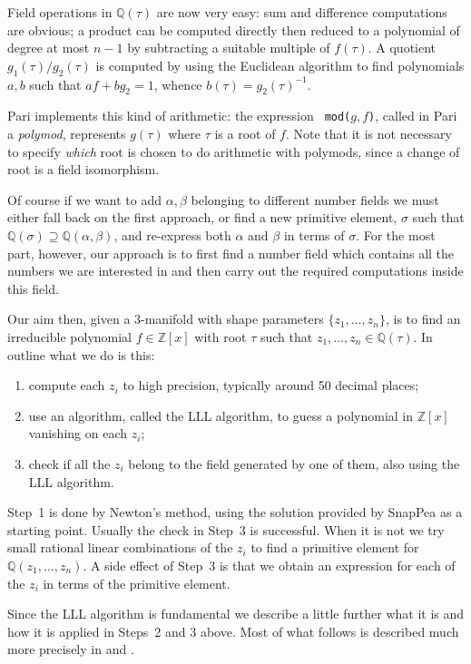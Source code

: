 \documentclass[a4paper]{amsart}
\def\Z{{\mathbb Z}}
\def\Q{{\mathbb Q}}
\theoremstyle{definition}
\begin{document}
Field operations in $\Q(\tau)$ are now very easy: sum and difference
computations are obvious; a product can be computed directly then
reduced to a polynomial of degree at most $n-1$ by subtracting a
suitable multiple of $f(\tau)$. A quotient  $g_1(\tau)/g_2(\tau)$ is
computed by using the Euclidean algorithm to find polynomials $a,b$ 
such that $af +
bg_2 = 1$, whence $b(\tau) = g_2(\tau)^{-1}$.

Pari \cite{pari} implements this kind of arithmetic: the expression {\tt
mod($g,f$)}, called in Pari a {\em polymod}, represents $g(\tau)$
where $\tau$ is a root of $f$. Note that it is not necessary to
specify {\em which} root is chosen to do arithmetic with polymods, since
a change of root is a field isomorphism.


Of course if we want to add $\alpha, \beta$ belonging to different
number fields we must either fall back on the first approach, or find
a new primitive element, $\sigma$ such that $\Q(\sigma) \supseteq
\Q(\alpha,\beta)$, and re-express both $\alpha$ and $\beta$ in terms of
$\sigma$. For the most part, however, our approach is to first find a
number field which contains all the numbers we are
interested in and then carry out the required computations inside this
field.


Our aim then, given a 3-manifold with shape parameters
$\{z_1,\ldots,z_n\}$, is to find an irreducible polynomial $f \in
\Z[x]$ with root $\tau$ such that $z_1,\ldots,z_n \in \Q(\tau)$. In
outline what we do is this:
\begin{enumerate}
\item compute each $z_i$ to high precision,
typically around 50 decimal places; 
\item use an algorithm, called the
LLL algorithm, to guess a polynomial in $\Z[x]$ vanishing on each
$z_i$;
\item check if all the $z_i$ belong to the field generated by one of
them, also using the  LLL algorithm. 
\end{enumerate}
Step~1 is done by Newton's method, using the solution provided by
SnapPea as a starting point. 
Usually the check in Step~3 is successful. When it is not we try small
rational linear combinations of the $z_i$ to find a primitive element
for $\Q(z_1,\ldots,z_n)$. A side effect of Step~3 is that we obtain
an expression for each of the $z_i$ in terms of the primitive element. 

Since the LLL algorithm is fundamental we describe a little further
what it is and how it is applied in Steps~2 and 3 above. Most of what
follows is described much more precisely in \cite{cohen} and
\cite{pohst}.
\end{document}
